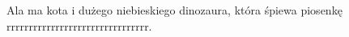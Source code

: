 \documentclass{article}
\begin{document}
Ala ma kota i dużego niebieskiego dinozaura, która śpiewa piosenkę
rrrrrrrrrrrrrrrrrrrrrrrrrrrrrrrr.
\end{document}
